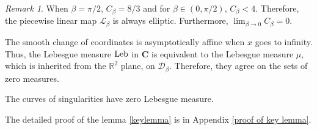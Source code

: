 \documentclass{article}
\numberwithin{figure}{section}
\numberwithin{equation}{section}
\theoremstyle{remark}
\newtheorem*{remark}{Remark}
\theoremstyle{definition}
\begin{document}
\begin{remark}
	\item[$\left( 1\right)$] When $\beta=\pi/2$, $C_\beta=8/3$ and for $\beta\in(0,\pi/2)$, $C_\beta<4$. Therefore, the piecewise linear map $\mathcal{L}_\beta$ is always elliptic. Furthermore, $\lim_{\beta \to 0}{C_\beta}=0$. 
    \item[$\left( 2\right)$] The smooth change of coordinates is asymptotically affine when $x$ goes to infinity. Thus, the Lebesgue measure ${\rm Leb}$ in $\textbf{C}$ is equivalent to the Lebesgue measure $\mu$, which is inherited from the $\mathbb{R}^2$ plane, on $\mathcal{D}_\beta$. Therefore, they agree on the sets of zero measures.
    \item[$\left( 3\right)$] The curves of singularities have zero Lebesgue measure.
\end{remark}
The detailed proof of the lemma \ref{keylemma} is in Appendix \ref{proof of key lemma}.
\end{document}
